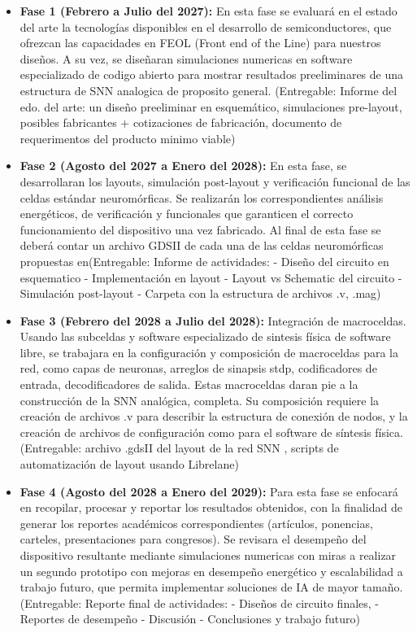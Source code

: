 \documentclass[letter, 12pt]{article}
\begin{document}
\begin{itemize}
    \item \textbf{Fase 1 (Febrero a Julio del 2027):} En esta fase se evaluará en el estado del arte la tecnologías disponibles en el desarrollo de semiconductores, que ofrezcan las capacidades en FEOL (Front end of the Line)  para nuestros diseños. A su vez, se diseñaran simulaciones numericas en software especializado de codigo abierto para mostrar resultados preeliminares de una estructura de SNN analogica de proposito general. (Entregable: Informe del edo. del arte: un diseño preeliminar en esquemático, simulaciones pre-layout, posibles fabricantes + cotizaciones de fabricación, documento de requerimentos del producto minimo viable)
    \item \textbf{Fase 2 (Agosto del 2027 a Enero del 2028):}  En esta fase, se desarrollaran los layouts, simulación post-layout y verificación funcional de las celdas estándar neuromórficas. Se realizarán los correspondientes análisis energéticos, de verificación y funcionales que garanticen el correcto funcionamiento del dispositivo una vez fabricado.  Al final de esta fase se deberá contar un archivo GDSII de cada una de las celdas neuromórficas propuestas en(Entregable: Informe de actividades: - Diseño del circuito en esquematico - Implementación en layout - Layout vs Schematic del circuito - Simulación post-layout - Carpeta con la estructura de archivos .v, .mag)
    \item \textbf{Fase 3 (Febrero del 2028 a Julio del 2028):} Integración de macroceldas. Usando las subceldas y software especializado de sintesis física de software libre, se trabajara en la configuración y composición de macroceldas para la red, como capas de neuronas, arreglos de sinapsis stdp, codificadores de entrada, decodificadores de salida. Estas macroceldas daran pie a la construcción de la SNN analógica, completa. Su composición requiere la creación de archivos .v para describir la estructura de conexión de nodos, y la creación de archivos de configuración como para el software de síntesis física. (Entregable: archivo .gdsII del layout de la red SNN , scripts de automatización de layout usando Librelane)
    \item \textbf{Fase 4 (Agosto del 2028 a Enero del 2029):} Para esta fase se enfocará en recopilar, procesar y reportar los resultados obtenidos, con la finalidad de generar los reportes académicos correspondientes (artículos, ponencias, carteles, presentaciones para congresos). Se revisara el desempeño del dispositivo resultante mediante simulaciones numericas con miras a realizar un segundo prototipo con mejoras en desempeño energético y escalabilidad a trabajo futuro, que permita implementar soluciones de IA de mayor tamaño. (Entregable: Reporte final de actividades: - Diseños de circuito finales, - Reportes de desempeño - Discusión - Conclusiones y trabajo futuro) 
\end{itemize}
\end{document}
